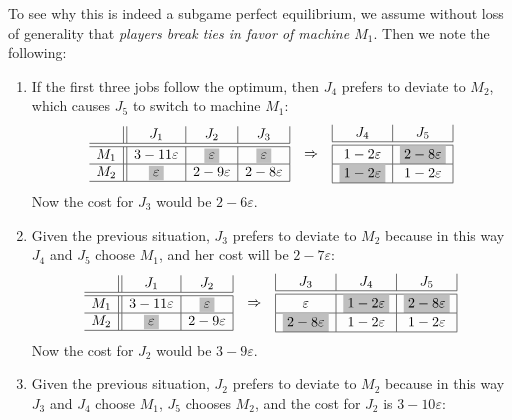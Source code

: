 \documentclass[12pt,a4paper]{article}
\theoremstyle{definition}
\theoremstyle{remark}
\newcommand{\take}[1]{\colorbox{emphcol}{$#1$}}
\renewcommand{\epsilon}{\varepsilon}
\begin{document}
	To see why this is indeed a subgame perfect equilibrium, we assume without loss of generality that \emph{players break ties in favor of machine $M_1$}. Then we note the following:
	\begin{enumerate}
		\item  If the first three jobs follow the optimum, then $J_4$ prefers to deviate to $M_2$, which causes $J_5$ to switch to machine $M_1$:
		\begin{align*}
		\begin{array}{c||c|c|c|}
		& J_1 & J_2 & J_3  \\ \hline \hline
		M_1 & 3-11\epsilon & \take{\epsilon} & \take{\epsilon}  \\ \hline 
		M_2 & \take{\epsilon} & 2-9\epsilon & 2-8\epsilon \\ \hline
		\end{array} &&
		\Rightarrow &&
		\begin{array}{|c|c|}
	     J_4 & J_5 \\ \hline\hline
		  1-2\epsilon & \take{2-8\epsilon} \\ \hline
	 \take{1-2\epsilon} & 1-2\epsilon \\ \hline
		\end{array}
		\end{align*} Now the cost for $J_3$ would be $2-6\epsilon$.
		\item  Given the previous situation, $J_3$ prefers to deviate to $M_2$ because in this way $J_4$ and $J_5$ choose $M_1$, and her cost will be $2-7\epsilon$:
		\begin{align*}\begin{array}{c||c|c|}
			& J_1 & J_2  \\ \hline \hline
			M_1 & 3-11\epsilon & \take{\epsilon}   \\ \hline 
			M_2 & \take{\epsilon} & 2-9\epsilon  \\ \hline
		\end{array} &&
		\Rightarrow &&
		\begin{array}{|c|c|c|}
		J_3 &	J_4 & J_5 \\ \hline\hline
			 \epsilon & \take{1-2\epsilon }& \take{2-8\epsilon} \\ \hline
			 \take{2-8\epsilon} & 1-2\epsilon & 1-2\epsilon \\ \hline
		\end{array}
	\end{align*}
		Now the cost for $J_2$ would be $3 - 9\epsilon$.
		\item  Given the previous situation, $J_2$ prefers to deviate to  $M_2$ because in this way $J_3$ and $J_4$ choose $M_1$,  $J_5$ chooses $M_2$, and the cost for $J_2$ is $3-10\epsilon$:

\end{enumerate}
\end{document}
